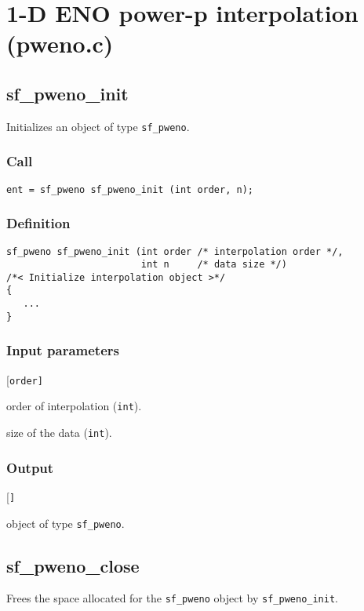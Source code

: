 \section{1-D ENO power-p interpolation (pweno.c)}




\subsection{{sf\_pweno\_init}}
Initializes an object of type \texttt{sf\_pweno}.

\subsubsection*{Call}
\begin{verbatim}ent = sf_pweno sf_pweno_init (int order, n);\end{verbatim}

\subsubsection*{Definition}
\begin{verbatim}
sf_pweno sf_pweno_init (int order /* interpolation order */,
                        int n     /* data size */)
/*< Initialize interpolation object >*/
{
   ...
}
\end{verbatim}

\subsubsection*{Input parameters}
\begin{desclist}{\tt }{\quad}[\tt order]
   \setlength\itemsep{0pt}
   \item[order] order of interpolation (\texttt{int}). 
   \item[n] size of the data (\texttt{int}).  
\end{desclist}

\subsubsection*{Output}
\begin{desclist}{\tt }{\quad}[\tt ]
   \setlength\itemsep{0pt}
   \item[ent] object of type \texttt{sf\_pweno}.
\end{desclist}




\subsection{{sf\_pweno\_close}}
Frees the space allocated for the \texttt{sf\_pweno} object by \texttt{sf\_pweno\_init}.

